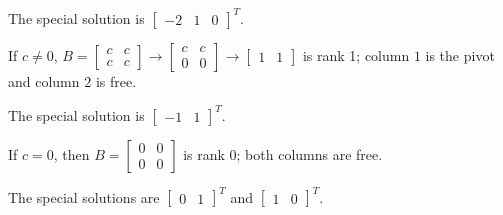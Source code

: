 \documentclass{article}
\begin{document}
\begin{enumerate}
		The special solution is $\begin{bmatrix} -2 & 1 & 0\end{bmatrix}^T$.

		\hrulefill

		If $c\neq0$, $B=\begin{bmatrix}
			c & c \\ c & c
		\end{bmatrix}\to \begin{bmatrix}
			c & c \\ 0 & 0
		\end{bmatrix}\to \begin{bmatrix}
			1 & 1
		\end{bmatrix}$ is rank 1; column $1$ is the pivot and column $2$ is free.

		The special solution is $\begin{bmatrix}
			-1 & 1
		\end{bmatrix}^T$.

		If $c=0$, then $B=\begin{bmatrix}
			0 & 0 \\ 0 & 0
		\end{bmatrix}$ is rank 0; both columns are free.

		The special solutions are $\begin{bmatrix}
			 0 & 1
		\end{bmatrix}^T$ and $\begin{bmatrix}
			 1 & 0
		\end{bmatrix}^T$.


\end{enumerate}
\end{document}
